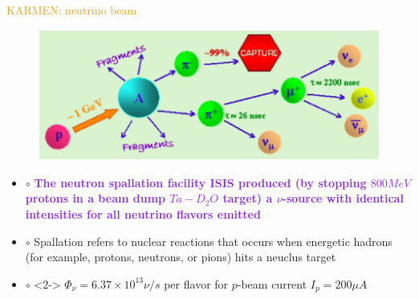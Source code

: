 \documentclass[11pt]{beamer} %
\renewcommand{\(}{\begin{columns}}
\renewcommand{\)}{\end{columns}}
\newcommand{\<}[1]{\begin{column}{#1}}
\renewcommand{\>}{\end{column}}
\newcommand{\itt}{\begin{itemize}}
\newcommand{\tti}{\end{itemize}}
\newcommand{\hlt}[2]{\textcolor{#1}{\textbf{#2}}}
\begin{document}
\begin{frame}{\textcolor{Goldenrod}{KARMEN: neutrino beam}}
  \begin{figure}[h]
    \centering
    \includegraphics[height=0.25\textheight, width=0.8\linewidth]{./Images/KARMEN09}
  \end{figure}
  \itt  
\item[$\circ$] \hlt{BlueViolet}{The neutron spallation facility ISIS produced (by
    stopping $800 MeV$ protons in a beam dump $Ta-D_2O$ target) a
    $\nu$-source with identical intensities for all neutrino flavors
    emitted}
\item[$\circ$] \alert{Spallation refers to nuclear reactions that occurs when energetic
    hadrons (for example, protons, neutrons, or pions) hits a neuclus target}
\item[$\circ$]<2-> $\Phi_{\nu} = 6.37 \times 10^{13} \nu/s$ per flavor for
  $p$-beam current $I_p = 200 \mu A$
  \tti
\end{frame}
\end{document}
